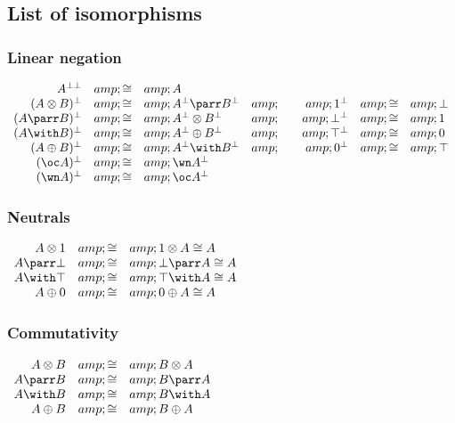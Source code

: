 \subsection{List of isomorphisms}\label{list-of-isomorphisms}

\subsubsection{Linear negation}\label{linear-negation-1}

\(\begin{array}{rclcrcl}
  A\biorth &amp;\cong&amp; A\\
  (A\tens B)\orth &amp;\cong&amp; A\orth\parr B\orth &amp;\quad&amp; \one\orth  &amp;\cong&amp; \bot\\
  (A\parr B)\orth &amp;\cong&amp; A\orth\tens B\orth &amp;\quad&amp; \bot\orth  &amp;\cong&amp; \one\\
  (A\with B)\orth &amp;\cong&amp; A\orth\plus B\orth &amp;\quad&amp; \top\orth  &amp;\cong&amp; \zero\\
  (A\plus B)\orth &amp;\cong&amp; A\orth\with B\orth &amp;\quad&amp; \zero\orth &amp;\cong&amp; \top\\
  (\oc A)\orth &amp;\cong&amp; \wn A\orth\\
  (\wn A)\orth &amp;\cong&amp; \oc A\orth\\
\end{array}\)

\subsubsection{Neutrals}\label{neutrals}

\(\begin{array}{rcl}
  A\tens\one  &amp;\cong&amp; \one\tens A\cong A\\
  A\parr\bot  &amp;\cong&amp; \bot\parr A\cong A\\
  A\with\top  &amp;\cong&amp; \top\with A\cong A\\
  A\plus\zero &amp;\cong&amp;\zero\plus A\cong A\\
\end{array}\)

\subsubsection{Commutativity}\label{commutativity-1}

\(\begin{array}{rcl}
  A\tens B &amp;\cong&amp; B\tens A\\
  A\parr B &amp;\cong&amp; B\parr A\\
  A\with B &amp;\cong&amp; B\with A\\
  A\plus B &amp;\cong&amp; B\plus A\\
\end{array}\)

